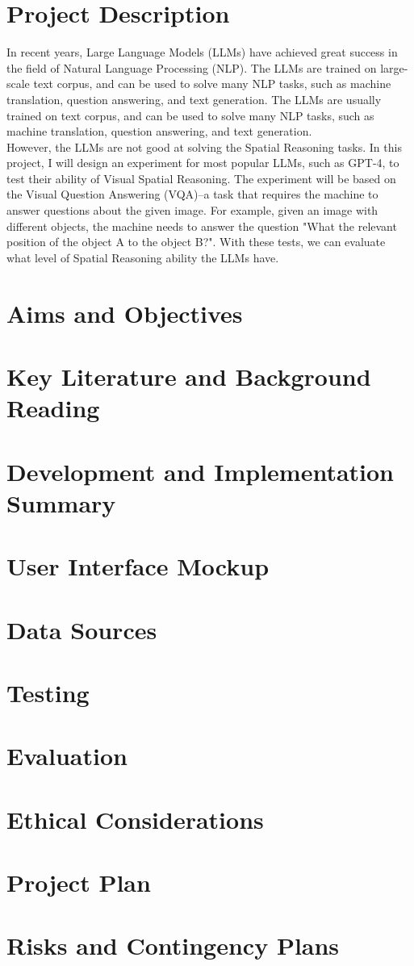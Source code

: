 \documentclass[journal,10pt]{IEEEtran}
\begin{document}

\section{Project Description}
In recent years, Large Language Models (LLMs) have achieved great success in the field of Natural Language Processing (NLP). The LLMs are trained on large-scale text corpus, and can be used to solve many NLP tasks, such as machine translation, question answering, and text generation. The LLMs are usually trained on text corpus, and can be used to solve many NLP tasks, such as machine translation, question answering, and text generation.\\
However, the LLMs are not good at solving the Spatial Reasoning tasks. In this project, I will design an experiment for most popular LLMs, such as GPT-4, to test their ability of Visual Spatial Reasoning. The experiment will be based on the Visual Question Answering (VQA)--a task that requires the machine to answer questions about the given image. For example, given an image with different objects, the machine needs to answer the question "What the relevant position of the object A to the object B?". With these tests, we can evaluate what level of Spatial Reasoning ability the LLMs have.\\
\section{Aims and Objectives}

\section{Key Literature and Background Reading}
\cite{borji2023categorical}
\section{Development and Implementation Summary}
\section{User Interface Mockup}
\section{Data Sources}
\section{Testing}
\section{Evaluation}
\section{Ethical Considerations}
\section{Project Plan}
\section{Risks and Contingency Plans}



\end{document}
